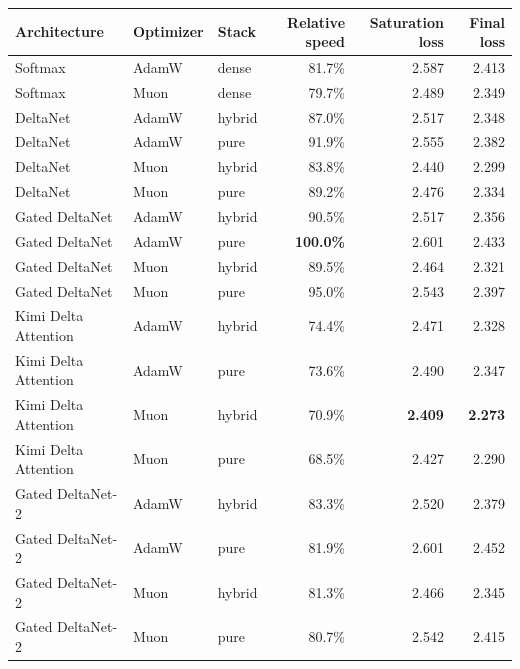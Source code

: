 \begin{tabular}{lllrrr}
\toprule
Architecture & Optimizer & Stack & Relative speed & Saturation loss & Final loss \\
\midrule
Softmax & AdamW & dense & 81.7\% & 2.587 & 2.413 \\
Softmax & Muon & dense & 79.7\% & 2.489 & 2.349 \\
DeltaNet & AdamW & hybrid & 87.0\% & 2.517 & 2.348 \\
DeltaNet & AdamW & pure & 91.9\% & 2.555 & 2.382 \\
DeltaNet & Muon & hybrid & 83.8\% & 2.440 & 2.299 \\
DeltaNet & Muon & pure & 89.2\% & 2.476 & 2.334 \\
Gated DeltaNet & AdamW & hybrid & 90.5\% & 2.517 & 2.356 \\
Gated DeltaNet & AdamW & pure & \textbf{100.0\%} & 2.601 & 2.433 \\
Gated DeltaNet & Muon & hybrid & 89.5\% & 2.464 & 2.321 \\
Gated DeltaNet & Muon & pure & 95.0\% & 2.543 & 2.397 \\
Kimi Delta Attention & AdamW & hybrid & 74.4\% & 2.471 & 2.328 \\
Kimi Delta Attention & AdamW & pure & 73.6\% & 2.490 & 2.347 \\
Kimi Delta Attention & Muon & hybrid & 70.9\% & \textbf{2.409} & \textbf{2.273} \\
Kimi Delta Attention & Muon & pure & 68.5\% & 2.427 & 2.290 \\
Gated DeltaNet-2 & AdamW & hybrid & 83.3\% & 2.520 & 2.379 \\
Gated DeltaNet-2 & AdamW & pure & 81.9\% & 2.601 & 2.452 \\
Gated DeltaNet-2 & Muon & hybrid & 81.3\% & 2.466 & 2.345 \\
Gated DeltaNet-2 & Muon & pure & 80.7\% & 2.542 & 2.415 \\
\bottomrule
\end{tabular}
